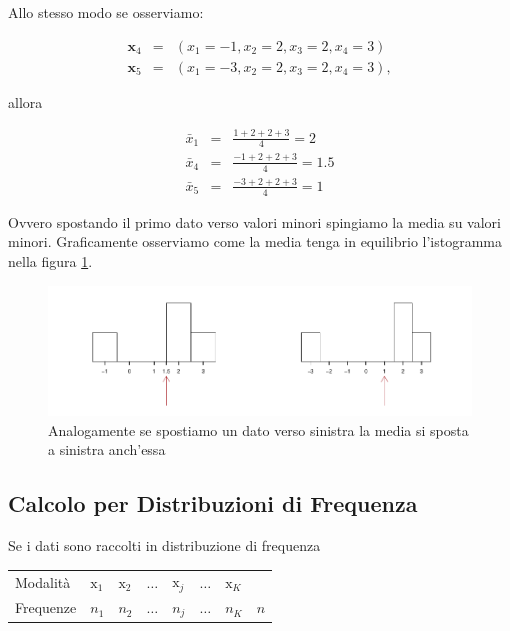 \documentclass[
  11pt,
]{book}
\theoremstyle{mytheoremstyle}
\theoremstyle{mydefstyle}
\begin{document}
Allo stesso modo se osserviamo:

\begin{eqnarray*}
  \mathbf{x}_4 &=&  (x_1 =-1,x_2=2,x_3=2,x_4=3)\\
  \mathbf{x}_5 &=&  (x_1 =-3,x_2=2,x_3=2,x_4=3),
\end{eqnarray*}

allora

\begin{eqnarray*}
  \bar x_1 &=&  \frac{1+2+2+3}{4}=2\\
  \bar x_4 &=&\frac{-1+2+2+3}{4}=1.5\\
  \bar x_5 &=&\frac{-3+2+2+3}{4}=1
\end{eqnarray*}

Ovvero spostando il primo dato verso valori minori spingiamo la media su valori minori.
Graficamente osserviamo come la media tenga in equilibrio l'istogramma nella figura \ref{fig:medh2}.

\begin{figure}[H]

{\centering \includegraphics{Appunti_di_Statistica_2025_files/figure-latex/medh2-1} 

}

\caption{Analogamente se spostiamo un dato verso sinistra la media si sposta a sinistra anch'essa}\label{fig:medh2}
\end{figure}

\subsection{Calcolo per Distribuzioni di Frequenza}\label{calcolo-per-distribuzioni-di-frequenza}

Se i dati sono raccolti in distribuzione di frequenza

\begin{tabular}[t]{llllllll}
\toprule
Modalità & $\mathrm{x}_1$ & $\mathrm{x}_2$ & $\ldots$ & $\mathrm{x}_j$ & $\ldots$ & $\mathrm{x}_K$ & \\
Frequenze & $n_1$ & $n_2$ & $\ldots$ & $n_j$ & $\ldots$ & $n_K$ & $n$\\
\bottomrule
\end{tabular}
\end{document}
